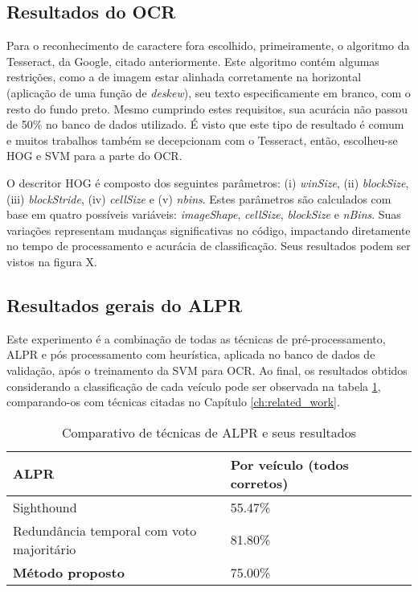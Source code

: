 \subsection{Resultados do OCR}
\label{sub:ocr}

Para o reconhecimento de caractere fora escolhido, primeiramente, o algoritmo da Tesseract, da Google, citado anteriormente. Este algoritmo contém algumas restrições, como a de imagem estar alinhada corretamente na horizontal (aplicação de uma função de \textit{deskew}), seu texto especificamente em branco, com o resto do fundo preto. Mesmo cumprindo estes requisitos, sua acurácia não passou de 50\% no banco de dados utilizado. É visto que este tipo de resultado é comum e muitos trabalhos também se decepcionam com o Tesseract, então, escolheu-se HOG e SVM para a parte do OCR.

O descritor HOG é composto dos seguintes parâmetros: (i) \textit{winSize}, (ii) \textit{blockSize}, (iii) \textit{blockStride}, (iv) \textit{cellSize} e (v) \textit{nbins}. Estes parâmetros são calculados com base em quatro possíveis variáveis: \textit{imageShape}, \textit{cellSize}, \textit{blockSize} e \textit{nBins}. Suas variações representam mudanças significativas no código, impactando diretamente no tempo de processamento e acurácia de classificação. Seus resultados podem ser vistos na figura X.

\subsection{Resultados gerais do ALPR}
\label{sub:all}

Este experimento é a combinação de todas as técnicas de pré-processamento, ALPR e pós processamento com heurística, aplicada no banco de dados de validação, após o treinamento da SVM para OCR. Ao final, os resultados obtidos considerando a classificação de cada veículo pode ser observada na tabela \ref{tab:compare_results}, comparando-os com técnicas citadas no Capítulo \ref{ch:related_work}.

\begin{table}[!htb]
\centering
\caption{Comparativo de técnicas de ALPR e seus resultados}
\label{tab:compare_results}
\begin{tabular}{llll}
\hline
ALPR                                      & Por veículo (todos corretos) &  &  \\ \hline
Sighthound                                & 55.47\%                      &  &  \\
Redundância temporal com voto majoritário & 81.80\%                      &  &  \\
\textbf{Método proposto}                  & 75.00\%                      &  &  \\ \hline
\end{tabular}
\end{table}


